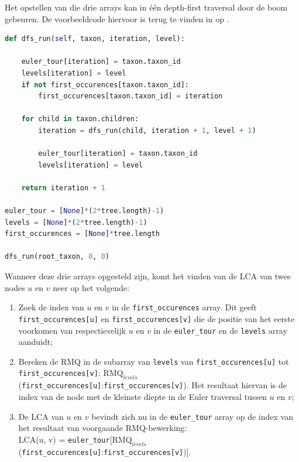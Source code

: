 Het opstellen van die drie arrays kan in één depth-first traversal door de boom 
gebeuren. De voorbeeldcode hiervoor is terug te vinden in  op 
.

\begin{lstlisting}[caption={Voorbeeldcode om het LCA probleem te reduceren naar 
een probleem dat met RMQ kan worden opgelost.}, label={lst:dfsrun}, 
language=Python, float]
def dfs_run(self, taxon, iteration, level):

    euler_tour[iteration] = taxon.taxon_id
    levels[iteration] = level
    if not first_occurences[taxon.taxon_id]:
        first_occurences[taxon.taxon_id] = iteration

    for child in taxon.children:
        iteration = dfs_run(child, iteration + 1, level + 1)

        euler_tour[iteration] = taxon.taxon_id
        levels[iteration] = level

    return iteration + 1

euler_tour = [None]*(2*tree.length)-1)
levels = [None]*(2*tree.length)-1)
first_occurences = [None]*tree.length

dfs_run(root_taxon, 0, 0)
\end{lstlisting}

Wanneer deze drie arrays opgesteld zijn, komt het vinden van de LCA van twee 
nodes $u$ en $v$ neer op het volgende:

\begin{enumerate}

\item Zoek de index van $u$ en $v$ in de \texttt{first\_occurences} array. Dit
geeft \texttt{first\_occurences[u]} en \texttt{first\_occurences[v]} die de
positie van het eerste voorkomen van respectievelijk $u$ en $v$ in de
\texttt{euler\_tour} en de \texttt{levels} array aanduidt;

\item Bereken de RMQ in de subarray van \texttt{levels} van
\texttt{first\_occurences[u]} tot\\
\texttt{first\_occurences[v]}:
$\text{RMQ}_{levels}$(\texttt{first\_occurences[u]}:\texttt{first\_occurences[v]}).
Het resultaat hiervan is de index van de node met de kleinste diepte in de 
Euler traversal tussen $u$ en $v$;

\item De LCA van $u$ en $v$ bevindt zich nu in de \texttt{euler\_tour} array op
de index van het resultaat van voorgaande RMQ-bewerking:\\ LCA(u, v) =
\texttt{euler\_tour}[$\text{RMQ}_{levels}$(\texttt{first\_occurences[u]}:\texttt{first\_occurences[v]})].

\end{enumerate}

